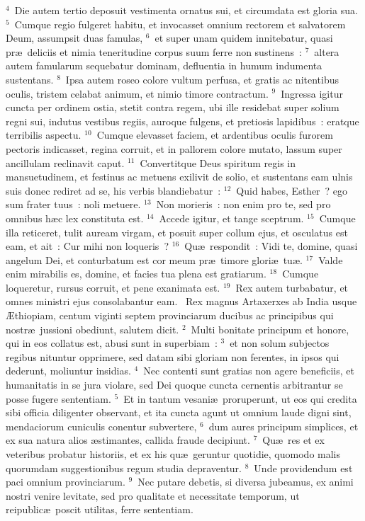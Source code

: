 ${}^{4}$~Die autem tertio deposuit vestimenta ornatus sui, et circumdata est gloria sua.
${}^{5}$~Cumque regio fulgeret habitu, et invocasset omnium rectorem et salvatorem Deum, assumpsit duas famulas,
${}^{6}$~et super unam quidem innitebatur, quasi pr\ae\ deliciis et nimia teneritudine corpus suum ferre non sustinens~:
${}^{7}$~altera autem famularum sequebatur dominam, defluentia in humum indumenta sustentans.
${}^{8}$~Ipsa autem roseo colore vultum perfusa, et gratis ac nitentibus oculis, tristem celabat animum, et nimio timore contractum.
${}^{9}$~Ingressa igitur cuncta per ordinem ostia, stetit contra regem, ubi ille residebat super solium regni sui, indutus vestibus regiis, auroque fulgens, et pretiosis lapidibus~: eratque terribilis aspectu.
${}^{10}$~Cumque elevasset faciem, et ardentibus oculis furorem pectoris indicasset, regina corruit, et in pallorem colore mutato, lassum super ancillulam reclinavit caput.
${}^{11}$~Convertitque Deus spiritum regis in mansuetudinem, et festinus ac metuens exilivit de solio, et sustentans eam ulnis suis donec rediret ad se, his verbis blandiebatur~:
${}^{12}$~Quid habes, Esther~? ego sum frater tuus~: noli metuere.
${}^{13}$~Non morieris~: non enim pro te, sed pro omnibus h\ae c lex constituta est.
${}^{14}$~Accede igitur, et tange sceptrum.
${}^{15}$~Cumque illa reticeret, tulit auream virgam, et posuit super collum ejus, et osculatus est eam, et ait~: Cur mihi non loqueris~?
${}^{16}$~Qu\ae\ respondit~: Vidi te, domine, quasi angelum Dei, et conturbatum est cor meum pr\ae\ timore glori\ae\ tu\ae .
${}^{17}$~Valde enim mirabilis es, domine, et facies tua plena est gratiarum.
${}^{18}$~Cumque loqueretur, rursus corruit, et pene exanimata est.
${}^{19}$~Rex autem turbabatur, et omnes ministri ejus consolabantur eam.
~Rex magnus Artaxerxes ab India usque \AE thiopiam, centum viginti septem provinciarum ducibus ac principibus qui nostr\ae\ jussioni obediunt, salutem dicit.
${}^{2}$~Multi bonitate principum et honore, qui in eos collatus est, abusi sunt in superbiam~:
${}^{3}$~et non solum subjectos regibus nituntur opprimere, sed datam sibi gloriam non ferentes, in ipsos qui dederunt, moliuntur insidias.
${}^{4}$~Nec contenti sunt gratias non agere beneficiis, et humanitatis in se jura violare, sed Dei quoque cuncta cernentis arbitrantur se posse fugere sententiam.
${}^{5}$~Et in tantum vesani\ae\ proruperunt, ut eos qui credita sibi officia diligenter observant, et ita cuncta agunt ut omnium laude digni sint, mendaciorum cuniculis conentur subvertere,
${}^{6}$~dum aures principum simplices, et ex sua natura alios \ae stimantes, callida fraude decipiunt.
${}^{7}$~Qu\ae\ res et ex veteribus probatur historiis, et ex his qu\ae\ geruntur quotidie, quomodo malis quorumdam suggestionibus regum studia depraventur.
${}^{8}$~Unde providendum est paci omnium provinciarum.
${}^{9}$~Nec putare debetis, si diversa jubeamus, ex animi nostri venire levitate, sed pro qualitate et necessitate temporum, ut reipublic\ae\ poscit utilitas, ferre sententiam.


